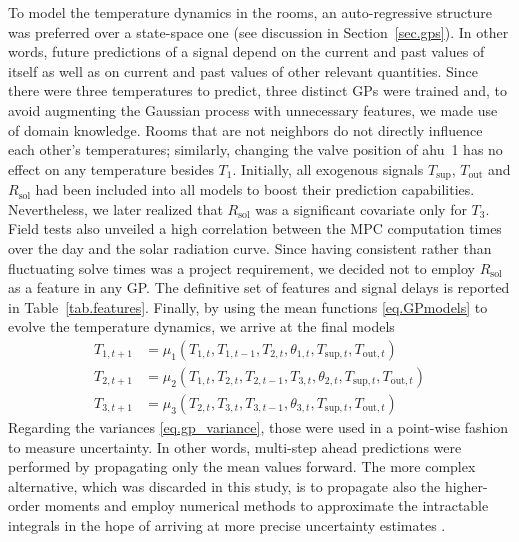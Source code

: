 To model the temperature dynamics in the rooms, an auto-regressive structure was preferred over a state-space one (see discussion in Section~\ref{sec.gps}). In other words, future predictions of a signal depend on the current and past values of itself as well as on current and past values of other relevant quantities. Since there were three temperatures to predict, three distinct GPs were trained and, to avoid augmenting the Gaussian process with unnecessary features, we made use of domain knowledge. Rooms that are not neighbors do not directly influence each other's temperatures; similarly, changing the valve position of \ac{ahu}~1 has no effect on any temperature besides $T_1$. Initially, all exogenous signals $T_\text{sup}$, $T_\text{out}$ and $R_\text{sol}$ had been included into all models to boost their prediction capabilities. Nevertheless, we later realized that $R_\text{sol}$ was a significant covariate only for $T_3$. Field tests also unveiled a high correlation between the MPC computation times over the day and the solar radiation curve. Since having consistent rather than fluctuating solve times was a project requirement, we decided not to employ $R_\text{sol}$ as a feature in any GP. The definitive set of features and signal delays is reported in Table~\ref{tab.features}. Finally, by using the mean functions \eqref{eq.GPmodels} to evolve the temperature dynamics, we arrive at the final models
\begin{subequations}
	\begin{align}
		T_{1,t+1} &= \mu_{1}(T_{1,t}, T_{1,t-1}, T_{2,t}, \theta_{1,t},T_{\text{sup},t},T_{\text{out},t}) \\
		T_{2,t+1} &= \mu_{2}(T_{1,t}, T_{2,t}, T_{2,t-1}, T_{3,t}, \theta_{2,t},T_{\text{sup},t},T_{\text{out},t}) \\
		T_{3,t+1} &= \mu_{3}(T_{2,t}, T_{3,t}, T_{3,t-1}, \theta_{3,t},T_{\text{sup},t},T_{\text{out},t}) 
	\end{align}
	\label{eq.GPmodels}
\end{subequations}
Regarding the variances \eqref{eq.gp_variance}, those were used in a point-wise fashion to measure uncertainty. In other words, multi-step ahead predictions were performed by propagating only the mean values forward. The more complex alternative, which was discarded in this study, is to propagate also the higher-order moments and employ numerical methods to approximate the intractable integrals in the hope of arriving at more precise uncertainty estimates \citep{girard2004approximate,mchutchon2011gaussian}.

